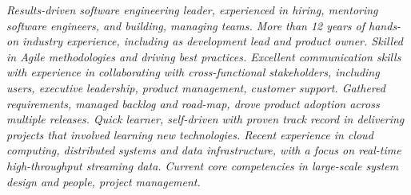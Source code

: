 {\selectfont
	\begin{justify}\textit{Results-driven software engineering leader, experienced in hiring, mentoring software engineers, and building, managing teams. More than 12 years of hands-on industry experience, including as development lead and product owner. Skilled in Agile methodologies and driving best practices. Excellent communication skills with experience in collaborating with cross-functional stakeholders, including users, executive leadership, product management, customer support. Gathered requirements, managed backlog and road-map, drove product adoption across multiple releases. Quick learner, self-driven with proven track record in delivering projects that involved learning new technologies. Recent experience in cloud computing, distributed systems and data infrastructure, with a focus on real-time high-throughput streaming data. Current core competencies in large-scale system design and people, project management.}\end{justify}
}
